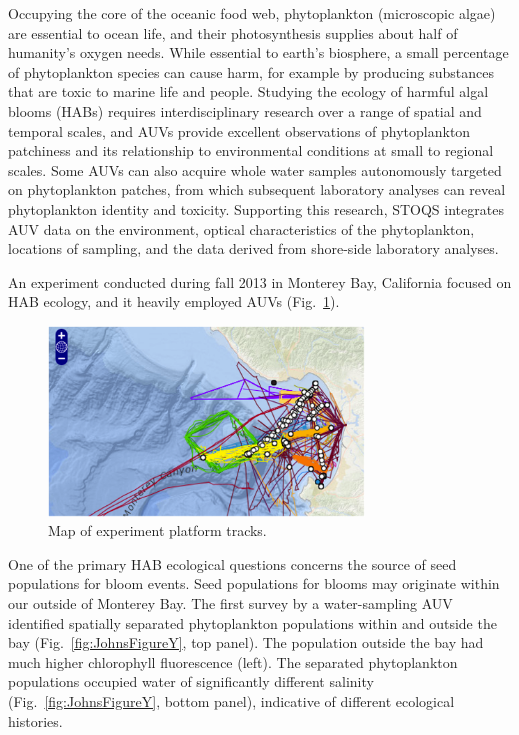 Occupying the core of the oceanic food web, phytoplankton (microscopic algae) are essential to ocean life, and their photosynthesis supplies about half of humanity’s oxygen needs.  While essential to earth’s biosphere, a small percentage of phytoplankton species can cause harm, for example by producing substances that are toxic to marine life and people.  Studying the ecology of harmful algal blooms (HABs) requires interdisciplinary research over a range of spatial and temporal scales, and AUVs provide excellent observations of phytoplankton patchiness and its relationship to environmental conditions at small to regional scales.  Some AUVs can also acquire whole water samples autonomously targeted on phytoplankton patches, from which subsequent laboratory analyses can reveal phytoplankton identity and toxicity.  Supporting this research, STOQS integrates AUV data on the environment, optical characteristics of the phytoplankton, locations of sampling, and the data derived from shore-side laboratory analyses.

An experiment conducted during fall 2013 in Monterey Bay, California focused on HAB ecology, and it heavily employed AUVs (Fig.~\ref{fig:JohnsFigureX}).  

\begin{figure}[htbp]
\centering
\includegraphics[width=3.3in]{JohnsFigureX.png}
\caption{Map of experiment platform tracks.}
\label{fig:JohnsFigureX}
\end{figure}

One of the primary HAB ecological questions concerns the source of seed populations for bloom events.  Seed populations for blooms may originate within our outside of Monterey Bay.  The first survey by a water-sampling AUV identified spatially separated phytoplankton populations within and outside the bay (Fig.~\ref{fig:JohnsFigureY}, top panel).  The population outside the bay had much higher chlorophyll fluorescence (left).  The separated phytoplankton populations occupied water of significantly different salinity (Fig.~\ref{fig:JohnsFigureY}, bottom panel), indicative of different ecological histories.

